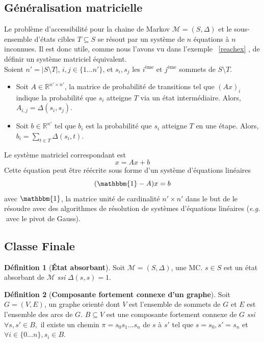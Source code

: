 \documentclass[12pt,a4paper]{report}
\theoremstyle{definition}%
\newtheorem{definition}{Définition}[chapter]
\theoremstyle{remark}
\newcommand{\eg}{\textit{e.g.} }
\newcommand{\ssi}{\textit{ssi} }
\let\labelitemi\labelitemii
\begin{document}
\subsection{Généralisation matricielle}
Le problème d'accessibilité pour la chaine de Markov $\mathcal{M} = (S, \Delta)$ et le sous-ensemble d'états cibles $T \subseteq S$ se résout par un système de $n$ équations à $n$ inconnues. Il est donc utile, comme nous l'avons vu dans l'exemple ~\ref{reachex} , de définir un système matriciel équivalent. \\
Soient $n' = |S \setminus T|$, $i, j \in \{1 \dots n'\}$, et $s_i, s_j$ les $i^{\text{ème}} \text{ et } j^{\text{ème}} $ sommets de $S \setminus T$. 
\begin{itemize}
\renewcommand{\labelitemi}{\tiny$\bullet$}
\item Soit $A \in \mathbb{R}^{n' \times n'}$, la matrice de probabilité de transitions tel que $(Ax)_{i}$ indique la probabilité que $s_i$ atteigne $T$ via un état intermédiaire. Alors, $A_{i,j} = \Delta(s_i, s_j)$.
\item Soit $b \in \mathbb{R}^{n'}$ tel que $b_{i}$ est la probabilité que $s_i$ atteigne $T$ en une étape. Alors, $b_i = \sum_{t \in T} \Delta(s_i, t)$.
\end{itemize}
Le système matriciel correspondant est
\[ x = Ax + b \]
Cette équation peut être réécrite sous forme d'un système d'équations linéaires
\[ (\mathbbm{1} - A) x = b \]
avec $\mathbbm{1}$, la matrice unité de cardinalité $n' \times n'$ dans le but de le résoudre avec des algorithmes de résolution de systèmes d'équations linéaires (\eg $\;$avec le pivot de Gauss).

\subsection{Classe Finale}
\begin{definition}[\textbf{\'Etat absorbant}]
	Soit $\mathcal{M} = (S, \Delta)$, une MC. $s \in S$ est un état absorbant de $\mathcal{M}$ \ssi $\Delta(s, s) = 1$.
\end{definition}

\begin{definition}[\textbf{Composante fortement connexe d'un graphe}]
	Soit $G=(V, E)$, un graphe orienté dont $V$ est l'ensemble de sommets de $G$ et $E$ est l'ensemble des arcs de $G$. $B \subseteq V$ est une composante fortement connexe de $G$ \ssi $\forall s,s' \in B,$ il existe un chemin $\pi = s_0 s_1 \dots s_n$ de $s$ à $s'$ tel que $s = s_0 , s' = s_n$ et $\forall i \in \{0 \dots n\}, s_i \in B$.
\end{definition}
\end{document}
